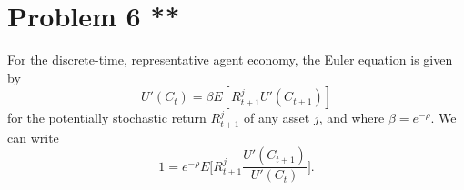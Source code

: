 \documentclass[11pt]{extarticle}
\theoremstyle{plain}
\theoremstyle{definition}
\begin{document}
\vspace{10mm}
\section*{Problem 6 **}



For the discrete-time, representative agent economy, the Euler equation is given by
\begin{equation*}
	U'(C_t) = \beta E[R_{t+1}^j U'(C_{t+1})]
\end{equation*}
for the potentially stochastic return $R_{t+1}^j$ of any asset $j$, and where $\beta = e^{-\rho}$. We can write 
\begin{equation*}
	1 = e^{-\rho} E\bigg[R_{t+1}^j \frac{U'(C_{t+1})}{U'(C_t)} \bigg].
\end{equation*}
\end{document}
